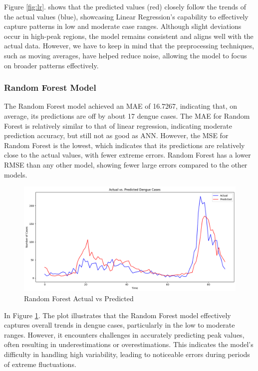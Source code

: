 \documentclass[runningheads]{llncs}
\begin{document}
Figure \ref{fig:lr}. shows that the predicted values (red) closely follow the trends of the actual values (blue), showcasing Linear Regression's capability to effectively capture patterns in low and moderate case ranges. Although slight deviations occur in high-peak regions, the model remains consistent and aligns well with the actual data. However, we have to keep in mind that the preprocessing techniques, such as moving averages, have helped reduce noise, allowing the model to focus on broader patterns effectively.

\subsubsection{Random Forest Model}
The Random Forest model achieved an MAE of 16.7267, indicating that, on average, its predictions are off by about 17 dengue cases. The MAE for Random Forest is relatively similar to that of linear regression, indicating moderate prediction accuracy, but still not as good as ANN. However, the MSE for Random Forest is the lowest, which indicates that its predictions are relatively close to the actual values, with fewer extreme errors. Random Forest has a lower RMSE than any other model, showing fewer large errors compared to the other models.


\begin{figure}[h!]
    \centering
    \includegraphics[width=1\linewidth]{image/Random Forest plot.png}
    \caption{Random Forest Actual vs Predicted}
    \label{fig:rf}
\end{figure}

In Figure \ref{fig:rf}. The plot illustrates that the Random Forest model effectively captures overall trends in dengue cases, particularly in the low to moderate ranges. However, it encounters challenges in accurately predicting peak values, often resulting in underestimations or overestimations. This indicates the model’s difficulty in handling high variability, leading to noticeable errors during periods of extreme fluctuations.\pagebreak
\end{document}

